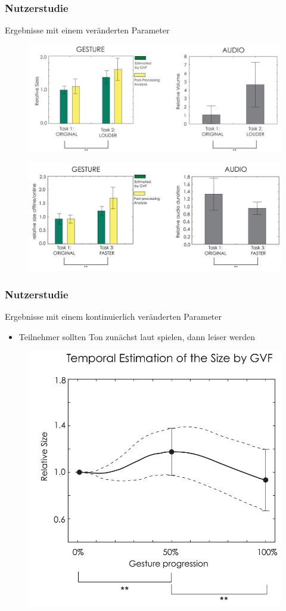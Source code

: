 \documentclass{beamer}
\begin{document}
\begin{frame}\frametitle{Nutzerstudie}
Ergebnisse mit einem veränderten Parameter
\begin{figure}
\centering
\includegraphics[width=0.7\linewidth]{../Bilder/Fig13}
\label{fig:Fig13}
\end{figure}
\begin{figure}
\centering
\includegraphics[width=0.7\linewidth]{../Bilder/Fig14}
\label{fig:Fig14}
\end{figure}
\end{frame}

\begin{frame}\frametitle{Nutzerstudie}
Ergebnisse mit einem kontinuierlich veränderten Parameter
\begin{itemize}
\item Teilnehmer sollten Ton zunächst laut spielen, dann leiser werden
\end{itemize}
\begin{figure}
\centering
\includegraphics[width=0.68\linewidth]{../Bilder/Fig16}
\label{fig:Fig16}
\end{figure}
\end{frame}
\end{document}
